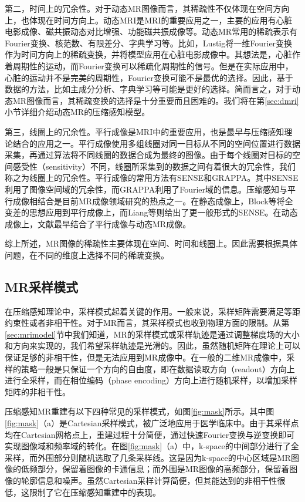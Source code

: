 第二，时间上的冗余性。对于动态MR图像而言，其稀疏性不仅体现在空间方向上，也体现在时间方向上。动态MRI是MRI的重要应用之一，主要的应用有心脏电影成像、磁共振动态对比增强、功能磁共振成像等。动态MR常用的稀疏表示有Fourier变换、核范数、有限差分、字典学习等。比如，Lustig\cite{lustig2006}将一维Fourier变换作为时间方向上的稀疏变换，并将模型应用在心脏电影成像中。其想法是，心脏作着周期性的运动，而Fourier变换可以稀疏化周期性的信号。但是在实际应用中，心脏的运动并不是完美的周期性，Fourier变换可能不是最优的选择。因此，基于数据的方法，比如主成分分析、字典学习等可能是更好的选择。简而言之，对于动态MR图像而言，其稀疏变换的选择是十分重要而且困难的。我们将在第\ref{sec:dmri}小节详细介绍动态MR的压缩感知模型。

第三，线圈上的冗余性。平行成像是MRI中的重要应用，也是最早与压缩感知理论结合的应用之一。平行成像使用多组线圈对同一目标从不同的空间位置进行数据采集，再通过算法将不同线圈的数据合成为最终的图像。由于每个线圈对目标的空间感受性（sensitivity）不同，线圈所采集到的数据之间有着很大的冗余性，我们称之为线圈上的冗余性。平行成像的常用方法有SENSE\cite{sense}和GRAPPA\cite{grappa}。其中SENSE利用了图像空间域的冗余性，而GRAPPA利用了Fourier域的信息。压缩感知与平行成像相结合是目前MR成像领域研究的热点之一。在静态成像上，Block等\cite{block2007undersampled}将全变差的思想应用到平行成像上，而Liang\cite{liang2009accelerating}等则给出了更一般形式的SENSE。在动态成像上，文献\cite{igrasp,focuss}最早结合了平行成像与动态MR成像。

综上所述，MR图像的稀疏性主要体现在空间、时间和线圈上。因此需要根据具体问题，在不同的维度上选择不同的稀疏变换。

\subsection{MR采样模式}
在压缩感知理论中，采样模式起着关键的作用。一般来说，采样矩阵需要满足等距约束性或者非相干性。对于MR而言，其采样模式也收到物理方面的限制。从第\ref{sec:mrimodel}节中我们知道，MR的采样模式或采样轨迹是通过调整梯度场的大小和方向来实现的，我们希望采样轨迹是光滑的。因此，虽然随机矩阵在理论上可以保证足够的非相干性，但是无法应用到MR成像中。在一般的二维MR成像中，采样的策略一般是只保证一个方向的自由度，即在数据读取方向（readout）方向上进行全采样，而在相位编码（phase encoding）方向上进行随机采样，以增加采样矩阵的非相干性。

压缩感知MR重建有以下四种常见的采样模式，如图\ref{fig:mask}所示。其中图\ref{fig:mask}（a）是Cartesian采样模式，被广泛地应用于医学临床中。由于其采样点均在Cartesian网格点上，重建过程十分简便，通过快速Fourier变换与逆变换即可实现图像域和频率域的转化。在图\ref{fig:mask}（a）中，k-space的中间部分进行了全采样，而外围部分则随机选取了几条采样线。这是因为k-space的中心区域是MR图像的低频部分，保留着图像的卡通信息；而外围是MR图像的高频部分，保留着图像的轮廓信息和噪声。虽然Cartesian采样计算简便，但其能达到的非相干性很低，这限制了它在压缩感知重建中的表现。

